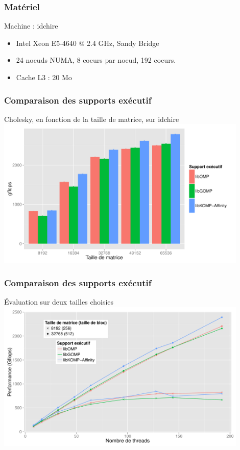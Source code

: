\documentclass[xcolor={usenames,dvipsnames,svgnames,table}, aspectratio=43]{beamer}
\begin{document}
\begin{frame}
\frametitle{Matériel}

\begin{block}{Machine : idchire}
    \begin{itemize}
\item Intel Xeon E5-4640 @ 2.4 GHz, Sandy Bridge
\item 24 noeuds NUMA, 8 coeurs par noeud, 192 coeurs.
\item Cache L3 : 20 Mo
    \end{itemize}
\end{block}

\end{frame}

\begin{frame}
  \frametitle{Comparaison des supports exécutif}
  Cholesky, en fonction de la taille de matrice, sur idchire
  \includegraphics[width=0.9\textwidth]{graph/graph_details_cholesky_idchire.pdf}
\end{frame}

\begin{frame}
  \frametitle{Comparaison des supports exécutif}
  Évaluation sur deux tailles choisies
  \includegraphics[width=0.9\textwidth]{graph/graph_all_cholesky_idchire.pdf}
\end{frame}
\end{document}
